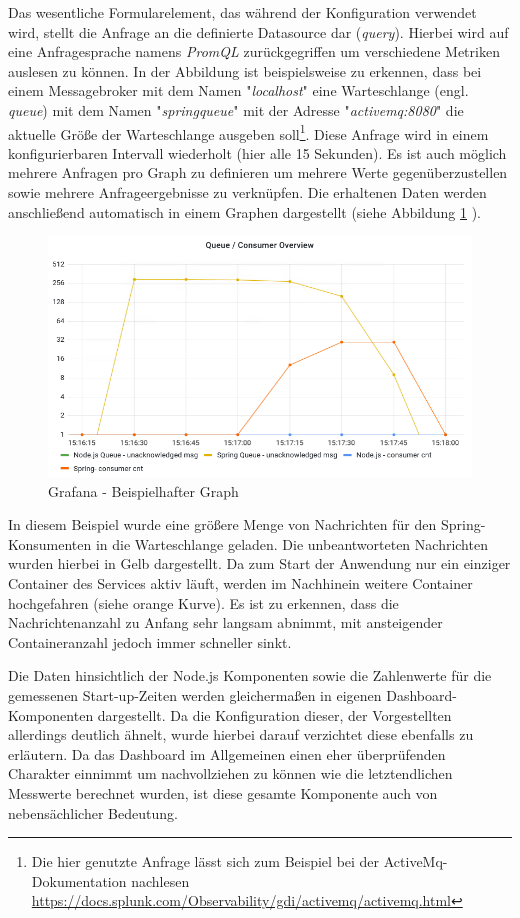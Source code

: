 Das wesentliche Formularelement, das während der Konfiguration verwendet wird, stellt die Anfrage an die definierte Datasource dar (\emph{query}). Hierbei wird auf eine Anfragesprache namens \emph{PromQL} zurückgegriffen um verschiedene Metriken auslesen zu können. In der Abbildung ist beispielsweise zu erkennen, dass bei einem Messagebroker mit dem Namen "\emph{localhost}" eine Warteschlange (engl. \emph{queue}) mit dem Namen "\emph{springqueue}" mit der Adresse "\emph{activemq:8080}" die aktuelle Größe der Warteschlange ausgeben soll\footnote{Die hier genutzte Anfrage lässt sich zum Beispiel bei der ActiveMq-Dokumentation nachlesen \url{https://docs.splunk.com/Observability/gdi/activemq/activemq.html}}. Diese Anfrage wird in einem konfigurierbaren Intervall wiederholt (hier alle 15 Sekunden). Es ist auch möglich mehrere Anfragen pro Graph zu definieren um mehrere Werte gegenüberzustellen sowie mehrere Anfrageergebnisse zu verknüpfen. Die erhaltenen Daten werden anschließend automatisch in einem Graphen dargestellt (siehe Abbildung \ref{fig:graphEx} ). 

\begin{figure}
	\centering
	\includegraphics[width=.8\linewidth]{kapitel/problemloesung/implementierung/_img/grafana-graphExample}
	\caption[]{Grafana - Beispielhafter Graph}
	\label{fig:graphEx}
\end{figure}

In diesem Beispiel wurde eine größere Menge von Nachrichten für den Spring-Konsumenten in die Warteschlange geladen. Die unbeantworteten Nachrichten wurden hierbei in Gelb dargestellt. Da zum Start der Anwendung nur ein einziger Container des Services aktiv läuft, werden im Nachhinein weitere Container hochgefahren (siehe orange Kurve). Es ist zu erkennen, dass die Nachrichtenanzahl zu Anfang sehr langsam abnimmt, mit ansteigender Containeranzahl jedoch immer schneller sinkt.

Die Daten hinsichtlich der Node.js Komponenten sowie die Zahlenwerte für die gemessenen Start-up-Zeiten werden gleichermaßen in eigenen Dashboard-Komponenten dargestellt. Da die Konfiguration dieser, der Vorgestellten allerdings deutlich ähnelt, wurde hierbei darauf verzichtet diese ebenfalls zu erläutern. Da das Dashboard im Allgemeinen einen eher überprüfenden Charakter einnimmt um nachvollziehen zu können wie die letztendlichen Messwerte berechnet wurden, ist diese gesamte Komponente auch von nebensächlicher Bedeutung.

